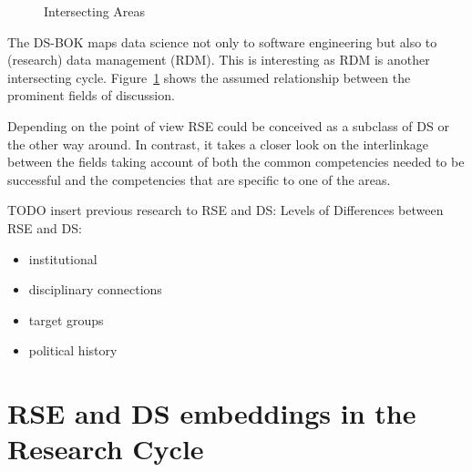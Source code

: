 \documentclass[
        english,biblatex
    ]{lni}
\providecommand{\tightlist}{%
    \setlength{\itemsep}{0pt}\setlength{\parskip}{0pt}}
\begin{document}
    \begin{figure}


    \caption{\label{fig-cycles}Intersecting Areas}

    \end{figure}%

    The DS-BOK maps data science not only to software engineering but
    also to (research) data management (RDM). This is interesting as RDM
    is another intersecting cycle. Figure~\ref{fig-cycles} shows the
    assumed relationship between the prominent fields of discussion.

    Depending on the point of view RSE could be conceived as a subclass
    of DS or the other way around. In contrast, it takes a closer look
    on the interlinkage between the fields taking account of both the
    common competencies needed to be successful and the competencies
    that are specific to one of the areas.

    TODO insert previous research to RSE and DS: Levels of Differences
    between RSE and DS:

    \begin{itemize}
    \tightlist
    \item
      institutional
    \item
      disciplinary connections
    \item
      target groups
    \item
      political history
    \end{itemize}

    \section{RSE and DS embeddings in the Research
    Cycle}\label{rse-and-ds-embeddings-in-the-research-cycle}
\end{document}
